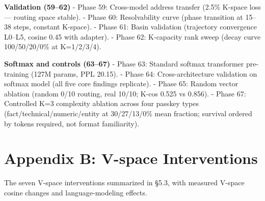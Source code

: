 \textbf{Validation (59--62)} - Phase 59: Cross-model address transfer (2.5\% K-space loss --- routing space stable). - Phase 60: Resolvability curve (phase transition at 15--38 steps, constant K-space). - Phase 61: Basin validation (trajectory convergence L0--L5, cosine 0.45 with adapter). - Phase 62: K-capacity rank sweep (decay curve 100/50/20/0\% at K=1/2/3/4).

\textbf{Softmax and controls (63--67)} - Phase 63: Standard softmax transformer pre-training (127M params, PPL 20.15). - Phase 64: Cross-architecture validation on softmax model (all five core findings replicate). - Phase 65: Random vector ablation (random 0/10 routing, real 10/10; K-cos 0.525 vs 0.856). - Phase 67: Controlled K=3 complexity ablation across four passkey types (fact/technical/numeric/entity at 30/27/13/0\% mean fraction; survival ordered by tokens required, not format familiarity).

\section{Appendix B: V-space Interventions}\label{appendix-b-v-space-interventions}

The seven V-space interventions summarized in \S 5.3, with measured V-space cosine changes and language-modeling effects.

